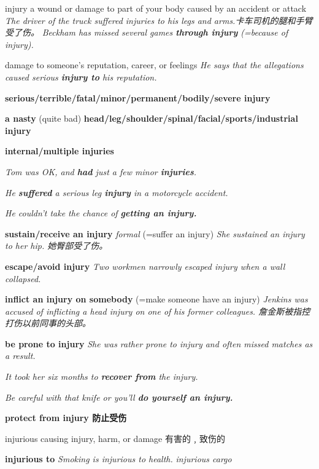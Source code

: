 \begin{DefWord}{injury}
    a wound or damage to part of your body caused by an accident or attack
    \textit{The driver of the truck suffered injuries to his legs and arms.卡车司机的腿和手臂受了伤。}
    \textit{Beckham has missed several games \textbf{through injury} (=because of injury).}

    damage to someone’s reputation, career, or feelings
    \textit{He says that the allegations caused serious \textbf{injury to} his reputation.}

    \textbf{serious/terrible/fatal/minor/permanent/bodily/severe injury}

    \textbf{a nasty} (quite bad) \textbf{head/leg/shoulder/spinal/facial/sports/industrial injury}

    \textbf{internal/multiple injuries}

    \textit{Tom was OK, and \textbf{had} just a few minor \textbf{injuries}.}

    \textit{He \textbf{suffered} a serious leg \textbf{injury} in a motorcycle accident.}

    \textit{He couldn’t take the chance of \textbf{getting an injury.}}

    \textbf{sustain/receive an injury} \textit{formal} (=suffer an injury)
     \textit{She sustained an injury to her hip. 她臀部受了伤。}

    \textbf{escape/avoid injury}
    \textit{Two workmen narrowly escaped injury when a wall collapsed.}

    \textbf{inflict an injury on somebody}  (=make someone have an injury)
    \textit{Jenkins was accused of inflicting a head injury on one of his former colleagues. 詹金斯被指控打伤以前同事的头部。}

    \textbf{be prone to injury}
    \textit{She was rather prone to injury and often missed matches as a result.}

    \textit{ It took her six months to \textbf{recover from} the injury.}

    \textit{Be careful with that knife or you’ll \textbf{do yourself an injury.}}

    \textbf{protect from injury 防止受伤}
\end{DefWord}

\begin{DefWord}{injurious}
    causing injury, harm, or damage 有害的﹐致伤的
    
    \textbf{injurious to}
    \textit{Smoking is injurious to health.}
    \textit{injurious cargo}
\end{DefWord}


